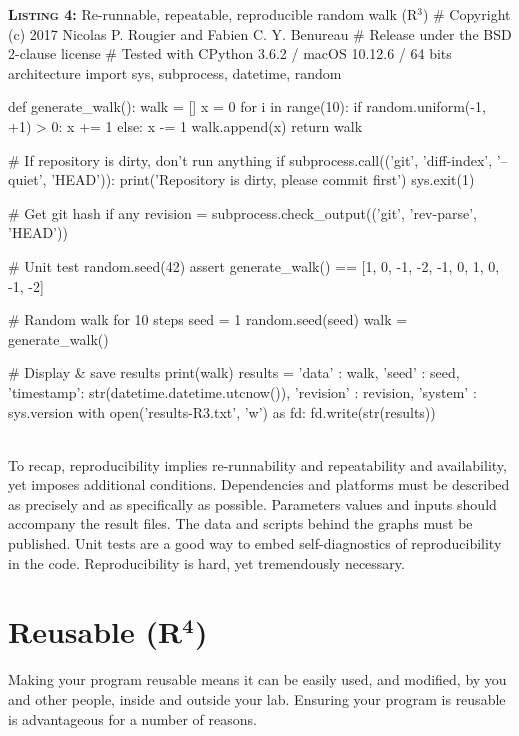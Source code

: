 \documentclass[a4paper,11pt]{article}
\begin{document}
\noindent \begin{minipage}[c]{\linewidth}
\begin{code}{\textbf{\textsc{Listing 4:}} Re-runnable, repeatable, reproducible random walk (R$^3$)}
# Copyright (c) 2017 Nicolas P. Rougier and Fabien C. Y. Benureau
# Release under the BSD 2-clause license
# Tested with CPython 3.6.2 / macOS 10.12.6 / 64 bits architecture
import sys, subprocess, datetime, random

def generate_walk():
    walk = []
    x = 0
    for i in range(10):
        if random.uniform(-1, +1) > 0:
            x += 1
        else:
            x -= 1
        walk.append(x)
    return walk

# If repository is dirty, don't run anything
if subprocess.call(('git', 'diff-index', '--quiet', 'HEAD')):
    print('Repository is dirty, please commit first')
    sys.exit(1)

# Get git hash if any
revision = subprocess.check_output(('git', 'rev-parse', 'HEAD'))

# Unit test
random.seed(42)
assert generate_walk() == [1, 0, -1, -2, -1, 0, 1, 0, -1, -2]

# Random walk for 10 steps
seed = 1
random.seed(seed)
walk = generate_walk()

# Display & save results
print(walk)
results = {'data'     : walk,
           'seed'     : seed,
           'timestamp': str(datetime.datetime.utcnow()),
           'revision' : revision,
           'system'   : sys.version}
with open('results-R3.txt', 'w') as fd:
    fd.write(str(results))
\end{code}
\end{minipage}\\

To recap, reproducibility implies re-runnability and repeatability and availability, yet imposes additional conditions. Dependencies and platforms must be described as precisely and as specifically as possible. Parameters values and inputs should accompany the result files. The data and scripts behind the graphs must be published. Unit tests are a good way to embed self-diagnostics of reproducibility in the code. Reproducibility is hard, yet tremendously necessary.


\section*{Reusable (R$^{\mathbf 4}$)}

Making your program reusable means it can be easily used, and modified, by you and other people, inside and outside your lab. Ensuring your program is reusable is advantageous for a number of reasons.\\
\end{document}
